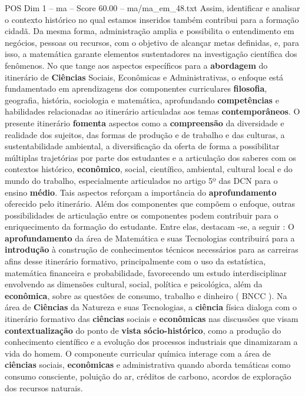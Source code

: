 \begin{textsample}{POS Dim 1 – ma – Score 60.00 – ma/ma\_em\_48.txt}
Assim, identificar e analisar o contexto histórico no qual estamos inseridos também contribui para a formação cidadã.
Da mesma forma, administração amplia e possibilita o entendimento em negócios, pessoas ou recursos, com o objetivo de alcançar metas definidas, e, para isso, a matemática garante elementos sustentadores na investigação científica dos fenômenos.
No que tange aos aspectos específicos para a \textbf{abordagem} do itinerário de \textbf{Ciências} Sociais, Econômicas e Administrativas, o enfoque está fundamentado em aprendizagens dos componentes curriculares \textbf{filosofia}, geografia, história, sociologia e matemática, aprofundando \textbf{competências} e habilidades relacionadas ao itinerário articuladas aos temas \textbf{contemporâneos}.
O presente itinerário \textbf{fomenta} aspectos como a \textbf{compreensão} da diversidade e realidade dos sujeitos, das formas de produção e de trabalho e das culturas, a sustentabilidade ambiental, a diversificação da oferta de forma a possibilitar múltiplas trajetórias por parte dos estudantes e a articulação dos saberes com os contextos histórico, \textbf{econômico}, social, científico, ambiental, cultural local e do mundo do trabalho, especialmente articulados no artigo 5º das DCN para o ensino \textbf{médio}.
Tais aspectos reforçam a importância do \textbf{aprofundamento} oferecido pelo itinerário.
Além dos componentes que compõem o enfoque, outras possibilidades de articulação entre os componentes podem contribuir para o enriquecimento da formação do estudante.
Entre elas, destacam -se, a seguir : O \textbf{aprofundamento} da área de Matemática e suas Tecnologias contribuirá para a \textbf{introdução} à construção de conhecimentos técnicos necessários para as carreiras afins desse itinerário formativo, principalmente com o uso da estatística, matemática financeira e probabilidade, favorecendo um estudo interdisciplinar envolvendo as dimensões cultural, social, política e psicológica, além da \textbf{econômica}, sobre as questões de consumo, trabalho e dinheiro ( BNCC ).
Na área de \textbf{Ciências} da Natureza e suas Tecnologias, a \textbf{ciência} física dialoga com o itinerário formativo das \textbf{ciências} sociais e \textbf{econômicas} nas discussões que visam \textbf{contextualização} do ponto de \textbf{vista} \textbf{sócio-histórico}, como a produção do conhecimento científico e a evolução dos processos industriais que dinamizaram a vida do homem.
O componente curricular química interage com a área de \textbf{ciências} sociais, \textbf{econômicas} e administrativa quando aborda temáticas como consumo consciente, poluição do ar, créditos de carbono, acordos de exploração dos recursos naturais.

\end{textsample}
